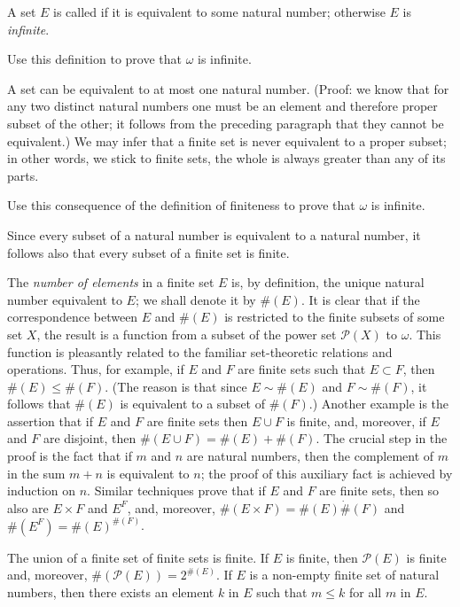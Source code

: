 A set $E$ is called  if it is equivalent to some natural number; otherwise $E$ is \textit{infinite}.
 
\begin{exercise} Use this definition to prove that $\omega$ is infinite.
\end{exercise}

A set can be equivalent to at most one natural number. (Proof: we know that for any two distinct natural numbers one must be an element and therefore proper subset of the other; it follows from the preceding paragraph that they cannot be equivalent.) We may infer that a finite set is never equivalent to a proper subset; in other words, we stick to finite sets, the whole is always greater than any of its parts. 

\begin{exercise} Use this consequence of the definition of finiteness to prove that $\omega$ is infinite. 
\end{exercise}

Since every subset of a natural number is equivalent to a natural number, it follows also that every subset of a finite set is finite. 

The \textit{number of elements} in a finite set $E$ is, by definition, the unique natural number equivalent to $E$; we shall denote it by $\# (E)$. It is clear that if the correspondence between $E$ and $\# (E)$ is restricted to the finite subsets of some set $X$, the result is a function from a subset of the power set $\mathcal{P}(X)$ to $\omega$. This function is pleasantly related to the familiar set-theoretic relations and operations. Thus, for example, if $E$ and $F$ are finite sets such that $E \subset F$, then $\# (E) \le \# (F)$. (The reason is that since $E \sim \# (E)$ and $F \sim \# (F)$, it follows that $\# (E)$ is equivalent to a subset of $\# (F)$.) Another example is the assertion that if $E$ and $F$ are finite sets then $E \cup F$ is finite, and, moreover, if $E$ and $F$ are disjoint, then $\# (E \cup F) = \# (E) + \# (F)$. The crucial step in the proof is the fact that if $m$ and $n$ are natural numbers, then the complement of $m$ in the sum $m + n$ is equivalent to $n$; the proof of this auxiliary fact is achieved by induction on $n$. Similar techniques prove that if $E$ and $F$ are finite sets, then so also are $E \times F$ and $E^{F}$, and, moreover, $\# (E \times F) = \# (E) \dot \# (F)$ and  $\# (E^{F}) = \# (E)^{\# (F)}$. 

\begin{exercise} The union of a finite set of finite sets is finite. If $E$ is finite, then $\mathcal{P}(E)$ is finite and, moreover, $\# (\mathcal{P}(E)) = 2^{\# (E)}$. If $E$ is a non-empty finite set of natural numbers, then there exists an element $k$ in $E$ such that $m \le k$ for all $m$ in $E$. 
\end{exercise}
